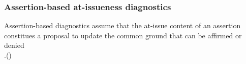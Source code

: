 \documentclass[compress, xcolor = dvipsnames, aspectratio=169, handout]{beamer}
\begin{document}
\begin{frame}[t]
	
	\end{frame}

	\begin{frame}[t]\frametitle{Assertion-based at-issueness diagnostics}\small
		Assertion-based diagnostics assume that the at-issue content of an assertion constitues a proposal to update the common ground that can be affirmed or denied\\ 
		\phantom.\hfill {\scriptsize(\citealt{farkas_reacting_2010,murray_varieties_2014,anderbois_at-issue_2015})} \vfill




\end{frame}
\end{document}
